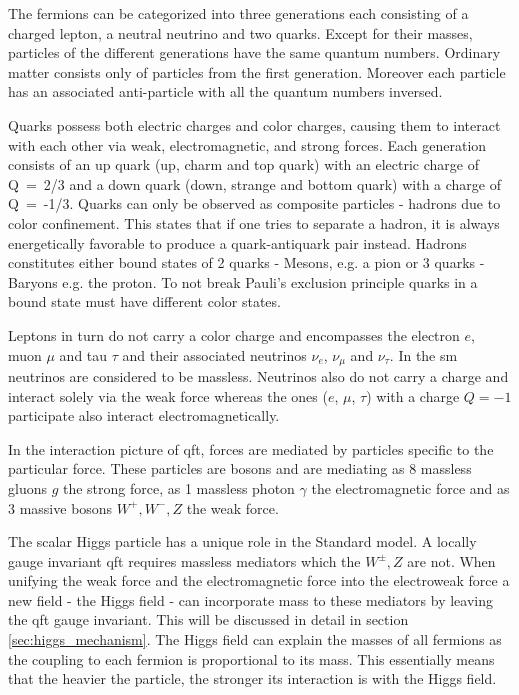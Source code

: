 The fermions can be categorized into three generations each consisting of a charged lepton, a neutral neutrino and two quarks. Except for their masses, particles of the different generations have the same quantum numbers. Ordinary matter consists only of particles from the first generation. Moreover each particle has an associated anti-particle with all the quantum numbers inversed.

Quarks possess both electric charges and color charges, causing them to interact with each other via weak, electromagnetic, and strong forces. Each generation consists of an up quark (up, charm and top quark) with an electric charge of \mbox{Q = 2/3} and a down quark (down, strange and bottom quark) with a charge of \mbox{Q = -1/3}. Quarks can only be observed as composite particles - hadrons due to color confinement. This states that if one tries to separate a hadron, it is always energetically favorable to produce a quark-antiquark pair instead. Hadrons constitutes either bound states of 2 quarks - Mesons, e.g. a pion or 3 quarks - Baryons e.g. the proton. To not break Pauli's exclusion principle quarks in a bound state must have different color states.

Leptons in turn do not carry a color charge and encompasses the electron $e$, muon $\mu$ and tau $\tau$ and their associated neutrinos $\nu_e$, $\nu_\mu$ and $\nu_\tau$. In the \ac{sm} neutrinos are considered to be massless. Neutrinos also do not carry a charge and interact solely via the weak force whereas the  ones ($e$, $\mu$, $\tau$) with a charge $Q=-1$ participate also interact electromagnetically.

In the interaction picture of \ac{qft}, forces are mediated by particles specific to the particular force. These particles are bosons and are mediating as 8 massless gluons $g$ the strong force, as 1 massless photon $\gamma$ the electromagnetic force and as 3 massive bosons $W^+,W^-,Z$ the weak force.

The scalar Higgs particle has a unique role in the Standard model. A locally gauge invariant \ac{qft} requires massless mediators which the $W^{\pm},Z$ are not. When unifying the weak force and the electromagnetic force into the electroweak force a new field - the Higgs field - can incorporate mass to these mediators by leaving the qft gauge invariant. This will be discussed in detail in section \ref{sec:higgs_mechanism}. The Higgs field can explain the masses of all fermions as the coupling to each fermion is proportional to its mass. This essentially means that the heavier the particle, the stronger its interaction is with the Higgs field.

